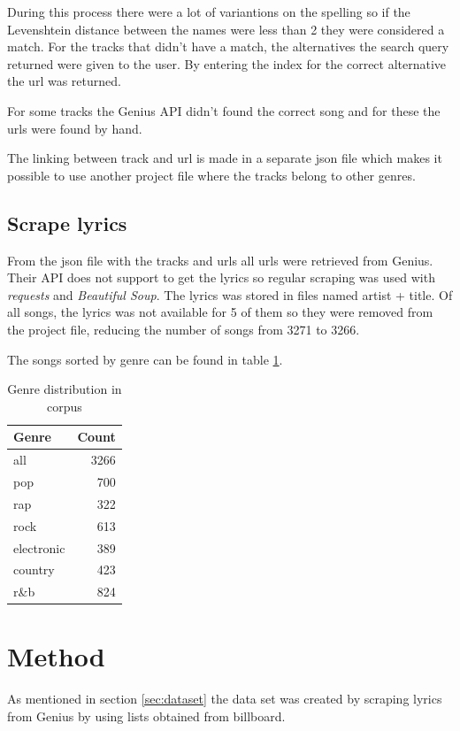\documentclass[a4paper, 12pt]{article}
\begin{document}
During this process there were a lot of variantions on the spelling so if the Levenshtein distance between the names were less than 2 they were considered a match.
For the tracks that didn't have a match, the alternatives the search query returned were given to the user.
By entering the index for the correct alternative the url was returned.

For some tracks the Genius API didn't found the correct song and for these the urls were found by hand.

The linking between track and url is made in a separate json file which makes it possible to use another project file where the tracks belong to other genres.

\subsection{Scrape lyrics}
From the json file with the tracks and urls all urls were retrieved from Genius.
Their API does not support to get the lyrics so regular scraping was used with \textit{requests} and \textit{Beautiful Soup}. \cite{requests} \cite{bs4}
The lyrics was stored in files named artist + title.
Of all songs, the lyrics was not available for 5 of them so they were removed from the project file, reducing the number of songs from 3271 to 3266.

The songs sorted by genre can be found in table \ref{tab:distribution}.
\begin{table}[h]
    \begin{center}
        \begin{tabular}{| l | r |}
            \hline
            Genre & Count \\ \hline
            all & 3266 \\
            pop & 700 \\
            rap & 322 \\
            rock & 613 \\
            electronic & 389 \\
            country & 423 \\
            r\&b & 824 \\ \hline
        \end{tabular}
        \caption{Genre distribution in corpus}
        \label{tab:distribution}
    \end{center}
    \end{table}

\section{Method}
As mentioned in section \ref{sec:dataset} the data set was created by scraping lyrics from Genius by using lists obtained from billboard.
\end{document}
